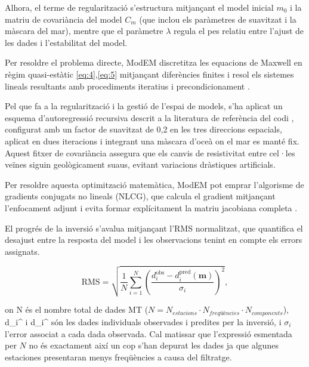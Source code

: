 \documentclass[11pt,a4paper,oneside]{article}
\begin{document}
\vspace{5pt}

Alhora, el terme de regularització s'estructura mitjançant el model inicial $m_0$ i la matriu de covariància del model $C_m$ (que inclou els paràmetres de suavitzat i la màscara del mar), mentre que el paràmetre $\lambda$ regula el pes relatiu entre l'ajust de les dades i l'estabilitat del model.
\vspace{5pt}

Per resoldre el problema directe, ModEM discretitza les equacions de Maxwell en règim quasi-estàtic \cref{eq:4},\cref{eq:5} mitjançant diferències finites i resol els sistemes lineals resultants amb procediments iteratius i precondicionament \citep{egbert2014}.
\vspace{5pt}

Pel que fa a la regularització i la gestió de l'espai de models, s'ha aplicat un esquema d'autoregressió recursiva descrit a la literatura de referència del codi \citep{egbert2014}, configurat amb un factor de suavitzat de 0,2 en les tres direccions espacials, aplicat en dues iteracions i integrant una màscara d'oceà on el mar es manté fix. Aquest fitxer de covariància assegura que els canvis de resistivitat entre cel·les veïnes siguin geològicament suaus, evitant variacions dràstiques artificials.
\vspace{5pt}

Per resoldre aquesta optimització matemàtica, ModEM pot emprar l'algorisme de gradients conjugats no lineals (NLCG), que calcula el gradient mitjançant l'enfocament adjunt i evita formar explícitament la matriu jacobiana completa \citep{rodi2001,egbert2014}.


\vspace{5pt}

El progrés de la inversió s'avalua mitjançant l'RMS normalitzat, que quantifica el desajust entre la resposta del model i les observacions tenint en compte els errors assignats.

\vspace{5pt}


\begin{equation}
    \text{RMS} = \sqrt{\dfrac{1}{N} \sum_{i=1}^{N} 
    \left( \dfrac{d_i^{\text{obs}} - d_i^{\text{pred}}(\mathbf{m})} {\sigma_i} \right)^{2}},
    \label{eq:17}
\end{equation}

\noindent
on N és el nombre total de dades MT ($N= N_{estacions}\cdot N_{freqüències} \cdot N_{components}$), d_i^{} i d_i^{} són les dades individuals observades i predites per la inversió, i $\sigma_i$ l'error associat a cada dada observada. Cal matissar que l'expressió esmentada per $N$ no és exactament així un cop s'han depurat les dades ja que algunes estaciones presentaran menys freqüències a causa del filtratge.
\vspace{5pt}
\end{document}
